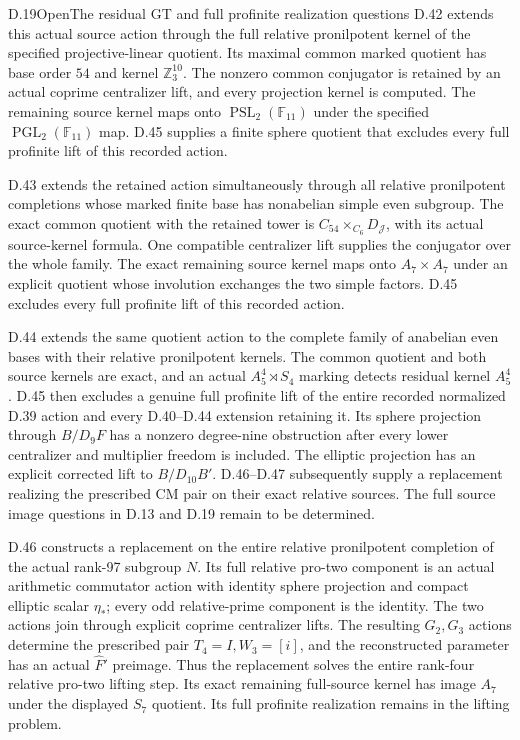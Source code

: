 \begin{statement}{D.19}{Open}{The residual GT and full profinite realization questions}
D.42 extends this actual source action through the full relative
pronilpotent kernel of the specified projective-linear quotient.
Its maximal common marked quotient has base order $54$ and kernel
$\mathbb Z_3^{10}$. The nonzero common conjugator is retained by
an actual coprime centralizer lift, and every projection kernel is
computed. The remaining source kernel maps onto
$\operatorname{PSL}_2(\mathbb F_{11})$ under the specified
$\operatorname{PGL}_2(\mathbb F_{11})$ map. D.45 supplies a finite sphere quotient that excludes every full profinite lift of this recorded action.


D.43 extends the retained action simultaneously through all relative
pronilpotent completions whose marked finite base has nonabelian
simple even subgroup. The exact common quotient with the retained
tower is $C_{54}\times_{C_6}D_{\mathscr J}$, with its actual
source-kernel formula. One compatible centralizer lift supplies the
conjugator over the whole family. The exact remaining source kernel
maps onto $A_7\times A_7$ under an explicit quotient whose involution
exchanges the two simple factors. D.45 excludes every full profinite lift of this recorded action.

D.44 extends the same quotient action to the complete family of
anabelian even bases with their relative pronilpotent kernels.
The common quotient and both source kernels are exact, and an
actual $A_5^4\rtimes S_4$ marking detects residual kernel $A_5^4$.
D.45 then excludes a genuine full profinite lift of the entire
recorded normalized D.39 action and every D.40--D.44 extension
retaining it. Its sphere projection through $B/D_9F$ has a
nonzero degree-nine obstruction after every lower centralizer
and multiplier freedom is included. The elliptic projection
has an explicit corrected lift to $B/D_{10}B'$. D.46--D.47 subsequently supply a replacement realizing the prescribed
CM pair on their exact relative sources. The full source image
questions in D.13 and D.19 remain to be determined.

D.46 constructs a replacement on the entire relative pronilpotent
completion of the actual rank-97 subgroup $N$. Its full relative
pro-two component is an actual arithmetic commutator action with
identity sphere projection and compact elliptic scalar $\eta_*$;
every odd relative-prime component is the identity. The two actions
join through explicit coprime centralizer lifts. The resulting
$G_2,G_3$ actions determine the prescribed pair $T_4=I,W_3=[i]$,
and the reconstructed parameter has an actual $\widehat F'$ preimage.
Thus the replacement solves the entire rank-four relative pro-two
lifting step. Its exact remaining full-source kernel has image
$A_7$ under the displayed $S_7$ quotient. Its full profinite
realization remains in the lifting problem.


\end{statement}
